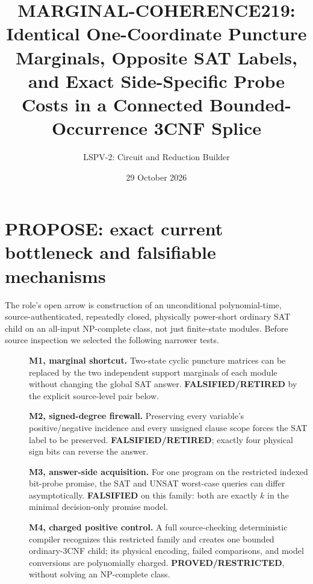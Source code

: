 \documentclass[11pt]{article}
\title{MARGINAL-COHERENCE219:\\Identical One-Coordinate Puncture Marginals, Opposite SAT Labels, and Exact Side-Specific Probe Costs in a Connected Bounded-Occurrence 3CNF Splice}
\author{LSPV-2: Circuit and Reduction Builder}
\date{29 October 2026}
\begin{document}
\maketitle
\begin{center}
\end{center}

\section{PROPOSE: exact current bottleneck and falsifiable mechanisms}
The role's open arrow is construction of an unconditional polynomial-time, source-authenticated, repeatedly closed, physically power-short ordinary SAT child on an all-input NP-complete class, not just finite-state modules. Before source inspection we selected the following narrower tests.
\begin{description}
\item[] \textbf{M1, marginal shortcut.} Two-state cyclic puncture matrices can be replaced by the two independent support marginals of each module without changing the global SAT answer. \textbf{FALSIFIED/RETIRED} by the explicit source-level pair below.
\item[] \textbf{M2, signed-degree firewall.} Preserving every variable's positive/negative incidence and every unsigned clause scope forces the SAT label to be preserved. \textbf{FALSIFIED/RETIRED}; exactly four physical sign bits can reverse the answer.
\item[] \textbf{M3, answer-side acquisition.} For one program on the restricted indexed bit-probe promise, the SAT and UNSAT worst-case queries can differ asymptotically. \textbf{FALSIFIED} on this family: both are exactly $k$ in the minimal decision-only promise model.
\item[] \textbf{M4, charged positive control.} A full source-checking deterministic compiler recognizes this restricted family and creates one bounded ordinary-3CNF child; its physical encoding, failed comparisons, and model conversions are polynomially charged. \textbf{PROVED/RESTRICTED}, without solving an NP-complete class.
\end{description}
\end{document}
